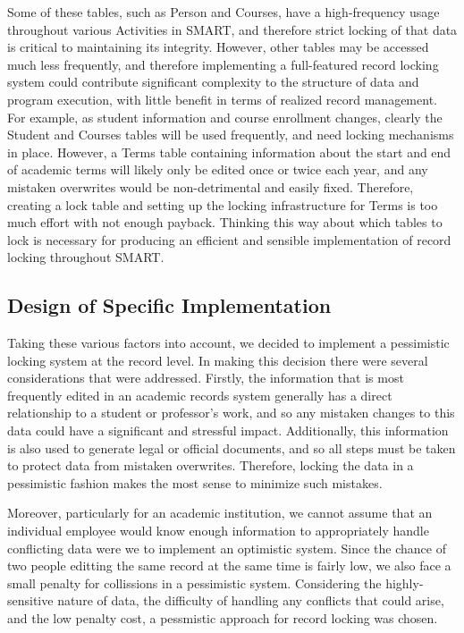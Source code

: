 \documentclass[12pt]{article}
\begin{document}
Some of these tables, such as Person and Courses, have a high-frequency usage throughout various Activities in SMART, and therefore strict locking of that data is critical to maintaining its integrity. However, other tables may be accessed much less frequently, and therefore implementing a full-featured record locking system could contribute significant complexity to the structure of data and program execution, with little benefit in terms of realized record management. For example, as student information and course enrollment changes, clearly the Student and Courses tables will be used frequently, and need locking mechanisms in place. However, a Terms table containing information about the start and end of academic terms will likely only be edited once or twice each year, and any mistaken overwrites would be non-detrimental and easily fixed. Therefore, creating a lock table and setting up the locking infrastructure for Terms is too much effort with not enough payback. Thinking this way about which tables to lock is necessary for producing an efficient and sensible implementation of record locking throughout SMART.

\subsection{Design of Specific Implementation}

Taking these various factors into account, we decided to implement a pessimistic locking system at the record level. In making this decision there were several considerations that were addressed. Firstly, the information that is most frequently edited in an academic records system generally has a direct relationship to a student or professor's work, and so any mistaken changes to this data could have a significant and stressful impact. Additionally, this information is also used to generate legal or official documents, and so all steps must be taken to protect data from mistaken overwrites. Therefore, locking the data in a pessimistic fashion makes the most sense to minimize such mistakes. 

Moreover, particularly for an academic institution, we cannot assume that an individual employee would know enough information to appropriately handle conflicting data were we to implement an optimistic system. Since the chance of two people editting the same record at the same time is fairly low, we also face a small penalty for collissions in a pessimistic system. Considering the highly-sensitive nature of data, the difficulty of handling any conflicts that could arise, and the low penalty cost, a pessmistic approach for record locking was chosen.
\end{document}
